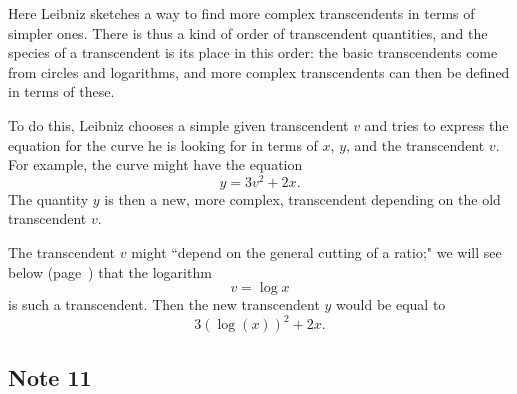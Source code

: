 \documentclass[twoside,openright]{article}
\begin{document}
Here Leibniz sketches a way to find more complex transcendents in
terms of simpler ones.  There is thus a kind of order of transcendent
quantities, and the species of a transcendent is its place in this
order: the basic transcendents come from circles and logarithms, and
more complex transcendents can then be defined in terms of these.

To do this, Leibniz chooses a simple given transcendent $v$ and tries
to express the equation for the curve he is looking for in terms of
$x$, $y$, and the transcendent $v$.  For example, the curve might have
the equation
$$y = 3v^2 + 2x.$$
The quantity $y$ is then a new, more complex, transcendent depending on the old transcendent $v$.

The transcendent $v$ might ``depend on the general cutting of a
ratio;" we will see below (page~\pageref{begmprop}) that the logarithm
$$v= \log x$$
is such  a transcendent.  Then the new transcendent $y$ would be equal to 
$$3(\log(x))^2 + 2x.$$



\subsection*{Note 11}
\label{crg11}
\end{document}
